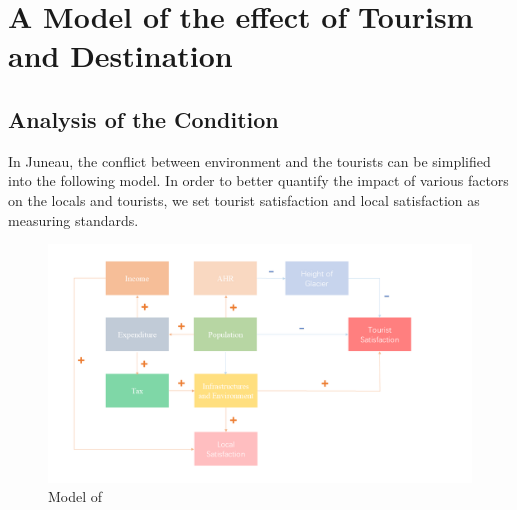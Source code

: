 \documentclass[12pt]{article}  %
\begin{document}
 
 
 \section{A Model of the effect of Tourism and Destination}
 \subsection{Analysis of the Condition}
 In Juneau, the conflict between environment and the tourists can be simplified into the following model. In order to better quantify the impact of various factors on the locals and tourists, we set tourist satisfaction and local satisfaction as measuring standards.
 
 \begin{figure}[htbp]  %
 
    \centering  %
    \includegraphics[width=1.2\textwidth]{chart1.png} %
    \caption{Model of } %
    \label{fig1}%
    \end{figure}
 
\end{document}
